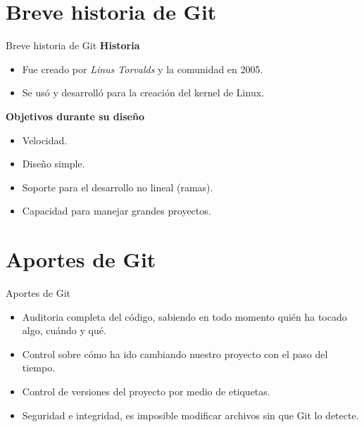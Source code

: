 \documentclass{beamer}
\begin{document}
\section{Breve historia de Git}
\begin{frame}{Breve historia de Git}
\textbf{Historia}
  \vspace{2mm}
\begin{itemize}
\item Fue creado por \textit{Linus Torvalds} y la comunidad en 2005.
\item Se usó y desarrolló para la creación del kernel de Linux.
\end{itemize}
  \vspace{2mm}
\textbf{Objetivos durante su diseño}
  \vspace{2mm}
\begin{itemize}
\item Velocidad.
\item Diseño simple.
\item Soporte para el desarrollo no lineal (ramas).
\item Capacidad para manejar grandes proyectos.
\end{itemize}
\end{frame}

\section*{Aportes de Git}
\begin{frame}{Aportes de Git}
\begin{itemize}
\item Auditoria completa del código, sabiendo en todo momento quién ha tocado algo, cuándo y qué.
\item Control sobre cómo ha ido cambiando nuestro proyecto con el paso del tiempo.
\item Control de versiones del proyecto por medio de etiquetas.
\item Seguridad e integridad, es imposible modificar archivos sin que Git lo detecte.
\end{itemize}
\end{frame}
\end{document}
